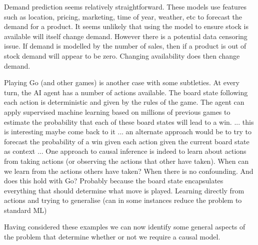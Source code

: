 \documentclass[11pt,a4paper,oneside]{book}
\theoremstyle{plain}
\theoremstyle{definition}
\begin{document}
Demand prediction seems relatively straightforward. These models use features such as location, pricing, marketing, time of year, weather, etc to forecast the demand for a product. It seems unlikely that using the model to ensure stock is available will itself change demand. However there is a potential data censoring issue. If demand is modelled by the number of sales, then if a product is out of stock demand will appear to be zero. Changing availability does then change demand.
   
Playing Go (and other games) is another case with some subtleties. At every turn, the AI agent has a number of actions available. The board state following each action is deterministic and given by the rules of the game. The agent can apply supervised machine learning based on millions of previous games to estimate the probability that each of these board states will lead to a win. ... this is interesting maybe come back to it ... an alternate approach would be to try to forecast the probability of a win given each action given the current board state as context ... One approach to causal inference is indeed to learn about actions from taking actions (or observing the actions that other have taken). When can we learn from the actions others have taken? When there is no confounding. And does this hold with Go? Probably because the board state encapsulates everything that should determine what move is played. Learning directly from actions and trying to generalise (can in some instances reduce the problem to standard ML)

Having considered these examples we can now identify some general aspects of the problem that determine whether or not we require a causal model.
\end{document}

